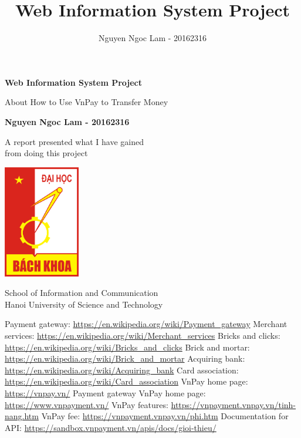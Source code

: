 \documentclass[12pt,a4paper]{article}
\title{Web Information System Project}
\date{\displaydate{date}}
\author{Nguyen Ngoc Lam - 20162316}
\begin{document}
\begin{titlepage}
	\begin{center}
		\vspace*{0.5cm}
		\Huge
		\textbf{Web Information System Project}

		\vspace{0.5cm}
		\LARGE
		About How to Use VnPay to Transfer Money
            
		\vspace{1.5cm}

		\textbf{Nguyen Ngoc Lam - 20162316}

		\vfill
            
		A report presented what I have gained \\
		from doing this project
            
		\vspace{0.8cm}
     
		\includegraphics[width=0.25\textwidth]{Logo_Hust.png}

		\Large
		School of Information and Communication\\
		Hanoi University of Science and Technology\\
	\end{center}
\end{titlepage}
\newpage
{}
\tableofcontents
\newpage
\begin{thebibliography}{}
Payment gateway: \url{https://en.wikipedia.org/wiki/Payment_gateway}
Merchant services: \url{https://en.wikipedia.org/wiki/Merchant_services}
Bricks and clicks: \url{https://en.wikipedia.org/wiki/Bricks_and_clicks}
Brick and mortar: \url{https://en.wikipedia.org/wiki/Brick_and_mortar}
Acquiring bank: \url{https://en.wikipedia.org/wiki/Acquiring_bank}
Card association: \url{https://en.wikipedia.org/wiki/Card_association}
VnPay home page: \url{https://vnpay.vn/}
Payment gateway VnPay home page: \url{https://www.vnpayment.vn/}
VnPay features: \url{https://vnpayment.vnpay.vn/tinh-nang.htm}
VnPay fee: \url{https://vnpayment.vnpay.vn/phi.htm}
Documentation for API: \url{https://sandbox.vnpayment.vn/apis/docs/gioi-thieu/}
\end{thebibliography}
\newpage
\end{document}
